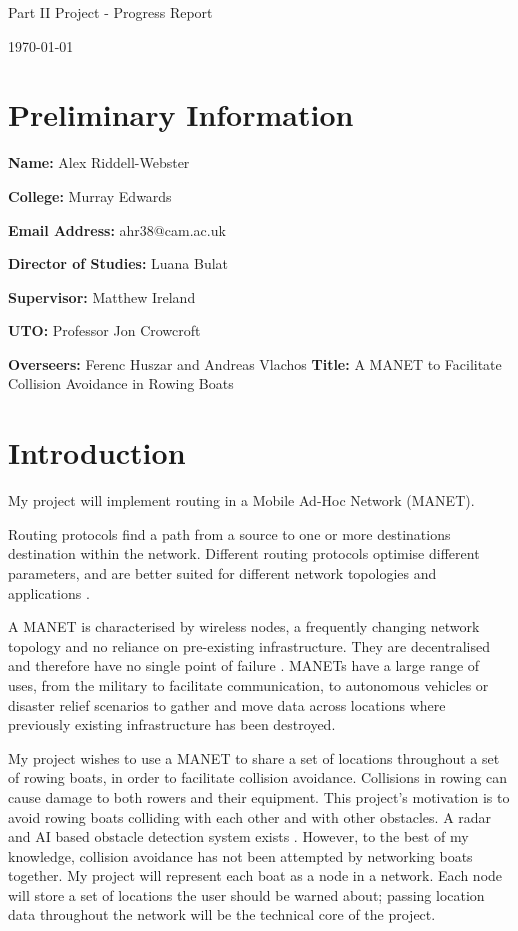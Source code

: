 \documentclass[10pt, a4paper]{article}
\begin{document}
\begin{center}
\Huge{Part II Project - Progress Report} \par
\Large{\today} \par
\end{center}
\par
\par

\section{Preliminary Information}
\textbf{Name:} Alex Riddell-Webster \par
\textbf{College:} Murray Edwards \par
\textbf{Email Address:} ahr38@cam.ac.uk \par
\textbf{Director of Studies:} Luana Bulat \par
\textbf{Supervisor:} Matthew Ireland \par
\textbf{UTO:} Professor Jon Crowcroft\par
\textbf{Overseers:}  Ferenc Huszar and Andreas Vlachos 
\textbf{Title:} A MANET to Facilitate Collision Avoidance in Rowing Boats

\section{Introduction}
My project will implement routing in a Mobile Ad-Hoc Network (MANET). \par

Routing protocols find a path from a source to one or more destinations destination within the network. Different routing protocols optimise different parameters, and are better suited for different network topologies and applications \cite{Routing}. \par 

A MANET is characterised by wireless nodes, a frequently changing network topology and no reliance on pre-existing infrastructure. They are decentralised and therefore have no single point of failure \cite{Manet}. MANETs have a large range of uses, from the military \cite{jtrs} to facilitate communication, to autonomous vehicles \cite{auto} or disaster relief scenarios \cite{disaster} to gather and move data across locations where previously existing infrastructure has been destroyed. \par

My project wishes to use a MANET to share a set of locations throughout a set of rowing boats, in order to facilitate collision avoidance. Collisions in rowing can cause damage to both rowers and their equipment. This project's motivation is to avoid rowing boats colliding with each other and with other obstacles. A radar and AI based obstacle detection system exists \cite{Rowcus}. However, to the best of my knowledge, collision avoidance has not been attempted by networking boats together. My project will represent each boat as a node in a network. Each node will store a set of locations the user should be warned about; passing location data throughout the network will be the technical core of the project. \par
\end{document}

